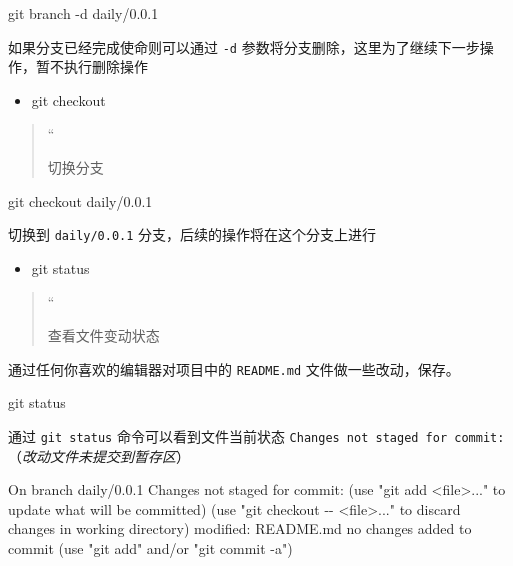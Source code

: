 \documentclass[
]{article}
\newenvironment{Shaded}{}{}
\newcommand{\NormalTok}[1]{#1}
\begin{document}
\begin{Shaded}
\begin{Highlighting}[]
\NormalTok{git branch {-}d daily/0.0.1}
\end{Highlighting}
\end{Shaded}

如果分支已经完成使命则可以通过 \texttt{-d}
参数将分支删除，这里为了继续下一步操作，暂不执行删除操作

\begin{itemize}
\item
  git checkout
\end{itemize}

\begin{quote}
``

切换分支
\end{quote}

\begin{Shaded}
\begin{Highlighting}[]
\NormalTok{git checkout daily/0.0.1}
\end{Highlighting}
\end{Shaded}

切换到 \texttt{daily/0.0.1} 分支，后续的操作将在这个分支上进行

\begin{itemize}
\item
  git status
\end{itemize}

\begin{quote}
``

查看文件变动状态
\end{quote}

通过任何你喜欢的编辑器对项目中的 \texttt{README.md}
文件做一些改动，保存。

\begin{Shaded}
\begin{Highlighting}[]
\NormalTok{git status}
\end{Highlighting}
\end{Shaded}

通过 \texttt{git\ status} 命令可以看到文件当前状态
\texttt{Changes\ not\ staged\ for\ commit:}
（\emph{改动文件未提交到暂存区}）

\begin{Shaded}
\begin{Highlighting}[]
\NormalTok{On branch daily/0.0.1}
\NormalTok{Changes not staged for commit:}
\NormalTok{  (use "git add \textless{}file\textgreater{}..." to update what will be committed)}
\NormalTok{  (use "git checkout {-}{-} \textless{}file\textgreater{}..." to discard changes in working directory)}
\NormalTok{    modified:   README.md}
\NormalTok{no changes added to commit (use "git add" and/or "git commit {-}a")}
\end{Highlighting}
\end{Shaded}
\end{document}
